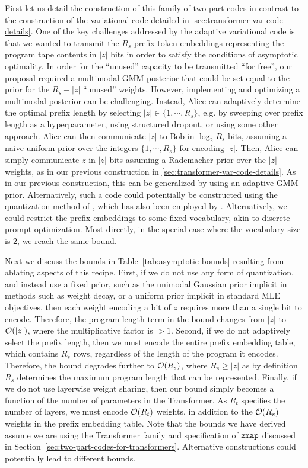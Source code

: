 First let us detail the construction of this family of two-part codes in contrast to the construction of the variational code detailed in \ref{sec:transformer-var-code-details}.
One of the key challenges addressed by the adaptive variational code is that we wanted to transmit the $R_s$ prefix token embeddings representing the program tape contents in $|z|$ bits in order to satisfy the conditions of asymptotic optimality. In order for the ``unused'' capacity to be transmitted ``for free'', our proposal required a multimodal GMM posterior that could be set equal to the prior for the $R_s - |z|$ ``unused'' weights. However, implementing and optimizing a multimodal posterior can be challenging. Instead, Alice can adaptively determine the optimal prefix length by selecting $|z| \in \{1, \cdots, R_s \}$, e.g. by sweeping over prefix length as a hyperparameter, using structured dropout, or using some other approach. Alice can then communicate $|z|$ to Bob in $\log_2 R_s$ bits, assuming a naive uniform prior over the integers $\{ 1, \cdots, R_s \}$ for encoding $|z|$. Then, Alice can simply communicate $z$ in $|z|$ bits assuming a Rademacher prior over the $|z|$ weights, as in our previous construction in \ref{sec:transformer-var-code-details}. As in our previous construction, this can be generalized by using an adaptive GMM prior. Alternatively, such a code could potentially be constructed using the quantization method of \citet{han2016deep}, which has also been employed by \citet{lotfi2022pac,lotfi2024non}. Alternatively, we could restrict the prefix embeddings to some fixed vocabulary, akin to discrete prompt optimization. Most directly, in the special case where the vocabulary size is $2$, we reach the same bound. 


Next we discuss the bounds in Table~\ref{tab:asymptotic-bounds} resulting from ablating aspects of this recipe. First, if we do not use any form of quantization, and instead use a fixed prior, such as the unimodal Gaussian prior implicit in methods such as weight decay, or a uniform prior implicit in standard MLE objectives, then each weight encoding a bit of $z$ requires more than a single bit to encode. Therefore, the program length term in the bound changes from $|z|$ to ${\mathcal{O}}(|z|)$, where the multiplicative factor is $>1$. Second, if we do not adaptively select the prefix length, then we must encode the entire prefix embedding table, which contains $R_s$ rows, regardless of the length of the program it encodes. Therefore, the bound degrades further to ${\mathcal{O}}(R_s)$, where $R_s \geq |z|$ as by definition $R_s$ determines the maximum program length that can be represented. Finally, if we do not use layerwise weight sharing, then our bound simply becomes a function of the number of parameters in the Transformer. As $R_t$ specifies the number of layers, we must encode ${\mathcal{O}}(R_t)$ weights, in addition to the ${\mathcal{O}}(R_s)$ weights in the prefix embedding table. Note that the bounds we have derived assume we are using the Transformer family and specification of $\texttt{zmap}$ discussed in Section~\ref{sec:two-part-codes-for-transformers}. Alternative constructions could potentially lead to different bounds.

